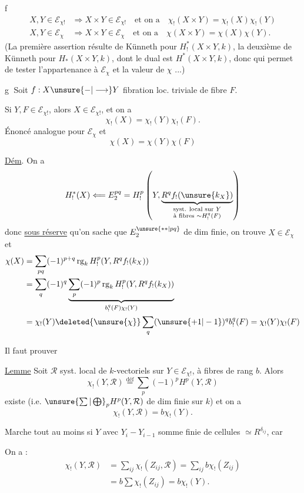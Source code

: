 
\textcircled{f}
\[
\begin{aligned}
X,Y\in\mathcal{E}_{\chi!}&\Longrightarrow X\times Y\in\mathcal{E}_{\chi!}\quad\text{et on a}\quad\chi_!(X\times Y)=\chi_!(X)\chi_!(Y)\\
X,Y\in\mathcal{E}_{\chi}&\Longrightarrow X\times Y\in\mathcal{E}_{\chi}\quad\text{et on a}\quad\chi(X\times Y)=\chi(X)\chi(Y).
\end{aligned}
\]
(La première assertion résulte de Künneth pour $H^*_!(X\times Y,k)$, la deuxième de Künneth pour $H_*(X\times Y,k)$, dont le dual est $H^*(X\times Y,k)$, donc qui permet de tester l'appartenance à $\mathcal{E}_{\chi}$ et la valeur de $\chi$ ...)

\textcircled{g} Soit $f:X\unsure{-|\longrightarrow}Y$ fibration loc. triviale de fibre $F$.

Si $Y,F\in\mathcal{E}_{\chi!}$, alors $X\in\mathcal{E}_{\chi!}$, et on a
\[
\chi_!(X)=\chi_!(Y)\chi_!(F).
\]
Énoncé analogue pour $\mathcal{E}_{\chi}$ et 
\[
\chi(X)=\chi(Y)\chi(F)
\]

\uline{Dém}. On a
\[
H^*_!(X)\Longleftarrow E_2^{pq}=H^p_!\left(Y,\underbrace{R^q f_!(\unsure{k_X})}_{\substack{\text{syst. local sur }Y\\\text{à fibres }\sim H^q_!(F)}}\right)
\]
donc \uline{sous réserve} qu'on sache que $E_2^{\unsure{**|pq}}$ de dim finie, on trouve $X\in\mathcal{E}_{\chi}$ et
\[
\begin{aligned}
\chi(X)&=\sum_{pq}(-1)^{p+q}\operatorname{rg}_k H^p_!(Y,R^q f_!(k_X))\\
&=\sum_q(-1)^q\underbrace{\sum_p(-1)^p\operatorname{rg}_k H^p_!(Y,R^q f_!(k_X))}_{b^q_!(F)\chi_!(Y)}\\
&=\chi_!(Y)\deleted{\unsure{\chi}}\sum_q(\unsure{+1|-1})^q b^q_!(F)=\chi_!(Y)\chi_!(F)
\end{aligned}
\]

Il faut prouver

\uline{Lemme} Soit $\mathcal{R}$ syst. local de $k$-vectoriels sur  $Y\in\mathcal{E}_{\chi!}$, à fibres de rang  $b$. Alors
\[
\chi_!(Y,\mathcal{R})\overset{\mathrm{déf}}=\sum_p(-1)^p H^p(Y,\mathcal{R})
\]
existe (i.e. $\unsure{\sum|\bigoplus}_p H^p(Y,\mathcal{R})$ de dim finie sur $k$) et on a
\[
\chi_!(Y,\mathcal{R})=b\chi_!(Y).
\]

Marche tout au moins si $Y$   avec $Y_i-Y_{i-1}$ somme finie de cellules $\simeq R^{\delta_{ij}}$, car

On a :
\[
\begin{aligned}
\chi_!(Y,\mathcal{R})&=\sum_{ij}\chi_!(Z_{ij},\mathcal{R})=\sum_{ij}b\chi_!(Z_{ij})\\
&=b\sum\chi_!(Z_{ij})=b\chi_!(Y).
\end{aligned}
\]
\margin{(\unsure{ct.} sur $Z_{ij}$\unsure{)|]}}

